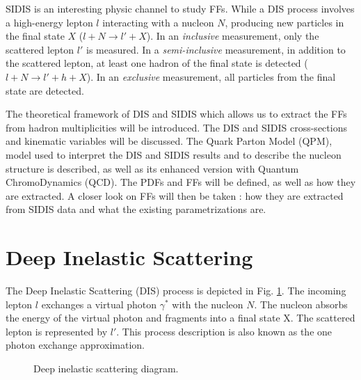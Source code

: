 SIDIS is an interesting physic channel to study FFs. While a DIS process involves a high-energy lepton $l$ interacting with a nucleon $N$, producing new particles in the final state $X$ ($l+N \rightarrow l'+X$). In an \textit{inclusive} measurement, only the scattered lepton $l'$ is measured. In a \textit{semi-inclusive} measurement, in addition to the scattered lepton, at least one hadron of the final state is detected ($l+N \rightarrow l'+h+X$). In an \textit{exclusive} measurement, all particles from the final state are detected.

The theoretical framework of DIS and SIDIS which allows us to extract the FFs from hadron multiplicities will be introduced. The DIS and SIDIS cross-sections and kinematic variables will be discussed. The Quark Parton Model (QPM), model used to interpret the DIS and SIDIS results and to describe the nucleon structure is described, as well as its enhanced version with Quantum ChromoDynamics (QCD). The PDFs and FFs will be defined, as well as how they are extracted. A closer look on FFs will then be taken : how they are extracted from SIDIS data and what the existing parametrizations are.

\section{Deep Inelastic Scattering}

The Deep Inelastic Scattering (DIS) process is depicted in Fig. \ref{pic:DIS}. The incoming lepton $l$ exchanges
a virtual photon $\gamma^*$ with the nucleon $N$. The nucleon absorbs the energy of the virtual photon and fragments
into a final state X. The scattered lepton is represented by $l'$. This process description is also known as the
one photon exchange approximation.

\begin{figure}[!h]
  \centering

	\caption{Deep inelastic scattering diagram.}
	\label{pic:DIS}
\end{figure}

